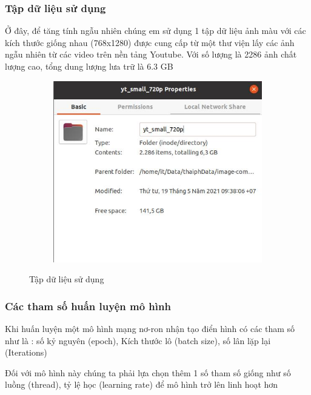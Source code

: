 \subsubsection{Tập dữ liệu sử dụng}

Ở đây, để tăng tính ngẫu nhiên chúng em sử dụng 1 tập dữ liệu ảnh màu với các 
kích thước giống nhau (768x1280) được cung cấp từ một thư viện lấy các ảnh ngẫu 
nhiên từ các video trên nền tảng Youtube. Với số lượng là 2286 ảnh chất 
lượng cao, tổng dung lượng lưa trữ là 6.3 GB

\begin{figure}
    \begin{subfigure}{0.6\textwidth}
        \includegraphics[width=1.\linewidth]{Chapters/items/data.jpg}
        \caption{}
        \label{fig: data}
    \end{subfigure}
    \caption{Tập dữ liệu sử dụng}
\end{figure}

\subsubsection{Các tham số huấn luyện mô hình}
Khi huấn luyện một mô hình mạng nơ-ron nhận tạo điển hình có 
các tham số như là : số kỷ nguyên (epoch), Kích thước lô (batch size), 
số lân lặp lại (Iterations)

Đối với mô hình này chúng ta phải lựa chọn thêm 1 số tham số giống như 
số luồng (thread), tỷ lệ học (learning rate) để mô hình trở lên linh hoạt hơn

